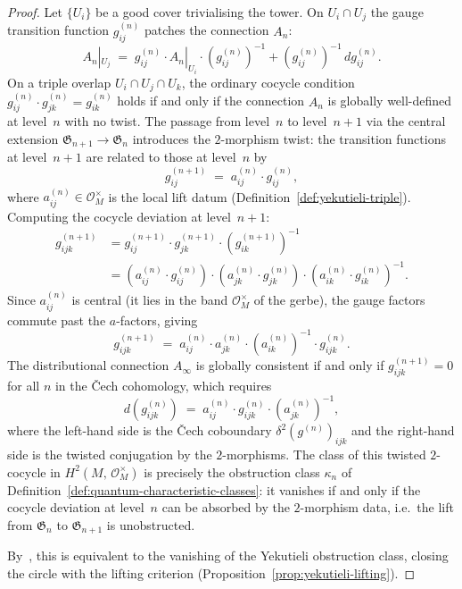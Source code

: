 \begin{proof}
Let $\{U_i\}$ be a good cover trivialising the tower.  On
$U_i \cap U_j$ the gauge transition function $g_{ij}^{(n)}$ patches
the connection $A_n$:
\[
  A_n|_{U_j} \;=\; g_{ij}^{(n)} \cdot A_n|_{U_i} \cdot
  (g_{ij}^{(n)})^{-1} + (g_{ij}^{(n)})^{-1}\, dg_{ij}^{(n)}.
\]
On a triple overlap $U_i \cap U_j \cap U_k$, the ordinary cocycle
condition $g_{ij}^{(n)} \cdot g_{jk}^{(n)} = g_{ik}^{(n)}$ holds if and
only if the connection $A_n$ is globally well-defined at level~$n$ with
no twist.  The passage from level~$n$ to level~$n{+}1$ via the central
extension $\mathfrak{G}_{n+1} \to \mathfrak{G}_n$ introduces the
$2$-morphism twist: the transition functions at level~$n{+}1$ are related
to those at level~$n$ by
\[
  g_{ij}^{(n+1)} \;=\; a_{ij}^{(n)} \cdot g_{ij}^{(n)},
\]
where $a_{ij}^{(n)} \in \mathcal{O}_M^{\times}$ is the local lift datum
(Definition~\ref{def:yekutieli-triple}).  Computing the cocycle deviation
at level~$n{+}1$:
\begin{align*}
  g_{ijk}^{(n+1)}
  &= g_{ij}^{(n+1)} \cdot g_{jk}^{(n+1)} \cdot (g_{ik}^{(n+1)})^{-1} \\
  &= (a_{ij}^{(n)} \cdot g_{ij}^{(n)}) \cdot (a_{jk}^{(n)} \cdot g_{jk}^{(n)})
     \cdot (a_{ik}^{(n)} \cdot g_{ik}^{(n)})^{-1}.
\end{align*}
Since $a_{ij}^{(n)}$ is central (it lies in the band
$\mathcal{O}_M^{\times}$ of the gerbe), the gauge factors commute past
the $a$-factors, giving
\[
  g_{ijk}^{(n+1)}
  \;=\;
  a_{ij}^{(n)} \cdot a_{jk}^{(n)} \cdot (a_{ik}^{(n)})^{-1}
  \cdot g_{ijk}^{(n)}.
\]
The distributional connection $A_\infty$ is globally consistent if and
only if $g_{ijk}^{(n+1)} = 0$ for all $n$ in the \v{C}ech cohomology,
which requires
\[
  d(g_{ijk}^{(n)})
  \;=\;
  a_{ij}^{(n)} \cdot g_{ijk}^{(n)} \cdot (a_{jk}^{(n)})^{-1},
\]
where the left-hand side is the \v{C}ech coboundary
$\delta^2(g^{(n)})_{ijk}$ and the right-hand side is the twisted
conjugation by the $2$-morphisms.  The class of this twisted $2$-cocycle
in $H^2(M,\, \mathcal{O}_M^{\times})$ is precisely the obstruction
class $\kappa_n$ of
Definition~\ref{def:quantum-characteristic-classes}: it vanishes if and
only if the cocycle deviation at level~$n$ can be absorbed by the
$2$-morphism data, i.e.\ the lift from $\mathfrak{G}_n$ to
$\mathfrak{G}_{n+1}$ is unobstructed.

By~\cite[Theorem~1.7]{yekutieli2010}, this is equivalent to the
vanishing of the Yekutieli obstruction class, closing the circle with
the lifting criterion (Proposition~\ref{prop:yekutieli-lifting}).
\end{proof}

